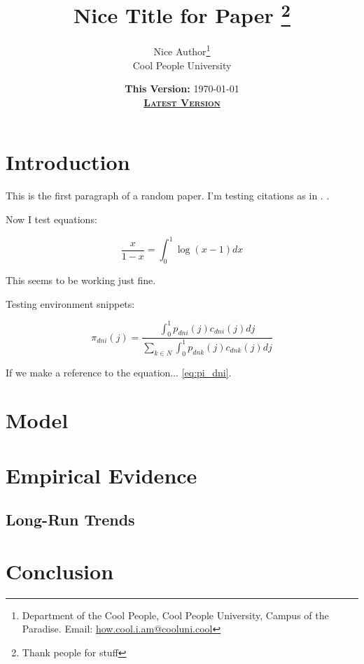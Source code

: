 \documentclass[a4paper,11pt]{article}
\title{\textbf{Nice Title for Paper}
\thanks{Thank people for stuff}}
\author{Nice Author\thanks{Department of the Cool People, Cool People University, Campus of the Paradise. Email: \href{mailto:how.cool.i.am@cooluni.cool}{how.cool.i.am@cooluni.cool}} \\
Cool People University}
\date{\textbf{This Version:} \today \\
\href{test_tex.pdf}{\textsc{\textbf{Latest Version}}}}
\begin{document}
\maketitle

\section{Introduction}

This is the first paragraph of a random paper. I'm testing citations as in \citep{rodrik2004hindugrowth,sivasubramonian2004humancapital,hsieh2009misallocation,broadberry2010historical,eichengreen2011servicegrowth,verma2012tfp,ziebarth2013misallocation,garciasantana2014reservationlaws}. \cite{acemoglu2008capitaldeepening,raurich2018labormobility,swiecki2017determinants}.

Now I test equations:

\[
\frac{x}{1-x} = \int^1_0 \log(x-1) dx
\]

This seems to be working just fine. 

Testing environment snippets:

\begin{equation}
	\tag{Trade Share}
	\pi_{dni}(j) = \frac{\int^1_0 p_{dni}(j)c_{dni}(j) dj}{\displaystyle\sum_{k\in N} \int^1_0 p_{dnk}(j)c_{dnk}(j) dj}
	\label{eq:pi_dni}
\end{equation}

If we make a reference to the equation... \eqref{eq:pi_dni}.

\section{Model}

\section{Empirical Evidence}

\subsection{Long-Run Trends}

\section{Conclusion}

\nocite{*}


\end{document}
